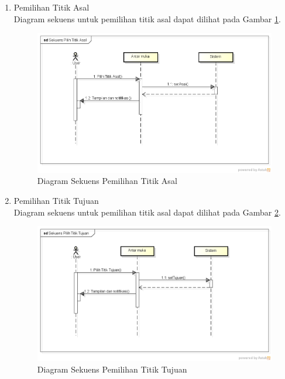 \begin{enumerate}
  \item Pemilihan Titik Asal\\
  Diagram sekuens untuk pemilihan titik asal dapat dilihat pada Gambar
  \ref{fig:sd_titikAsal}.
\begin{figure}[h]
\centering
\includegraphics[scale=0.5]{Gambar/sd_titikAsal}
\caption[Diagram Sekuens Pemilihan Titik Asal]{Diagram Sekuens Pemilihan Titik
Asal}
\label{fig:sd_titikAsal}
\end{figure}
  
  \item Pemilihan Titik Tujuan\\
  Diagram sekuens untuk pemilihan titik asal dapat dilihat pada Gambar
  \ref{fig:sd_titikTujuan}.
\begin{figure}[h]
\centering
\includegraphics[scale=0.5]{Gambar/sd_titikTujuan}
\caption[Diagram Sekuens Pemilihan Titik Tujuan]{Diagram Sekuens Pemilihan Titik
Tujuan}
\label{fig:sd_titikTujuan}
\end{figure}
  

\end{enumerate}
